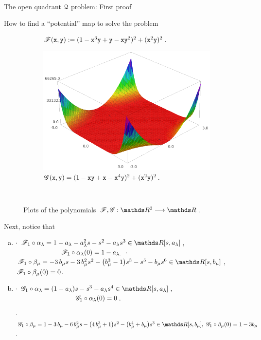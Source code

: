 \documentclass[11pt, a4paper, english, twoside, notitlepage, openright]{report}
\begin{document}
\begin{chapter}{The open quadrant $\mathcal{Q}$ problem: First proof}
\begin{section}{How to find a ``potential'' map to solve the problem}
\begin{figure}[h]
\begin{subfigure}{.49\linewidth}
\caption{$\mathscr{F}({\tt x},{\tt y}):=(1-{\tt x}^3{\tt y}+{\tt y}-{\tt x}{\tt y}^2)^2+({\tt x}^2{\tt y})^2$.\label{fig:F}}
\end{subfigure}
\begin{subfigure}{.50\linewidth}\centering
\includegraphics[width=1\textwidth]{plots/ch1_05_G.png}
\caption{$\mathscr{G}({\tt x},{\tt y})=(1-{\tt x}{\tt y}+{\tt x}-{\tt x}^4{\tt y})^2+({\tt x}^2{\tt y})^2$.\label{fig:G}}
\end{subfigure}\\[1ex]
\caption{Plots of the polynomials $\F,\G:\R^2\longrightarrow\R$.\label{fig:plotFG}}
\end{figure}
Next, notice that
\begin{enumerate}[(a)]
\item $\cdot$ $\F_1\circ\alpha_\lambda=1-a_{\lambda}-a_{\lambda}^{2} s-s^{2}-a_{\lambda} s^{3}\in\R[s,a_{\lambda}]$,
$\qquad\qquad\qquad \,\, \, \,   \mathscr{F}_1\circ\alpha_{\lambda }(0)=1-a_{\lambda. }$ \newline
$\cdot$ $\F_1\circ\beta_{\mu}=-3\,b_{\mu}s-3 \,b_{\mu}^{2} s^{2}-{\left(b_{\mu}^{3}-1\right)}s^{3}-s^{5}-b_{\mu}s^{6}\in\R[s,b_{\mu}]$,
$\, \mathscr{F}_1\circ\beta_{\mu}(0)=0$.
				
\item $\cdot$ $ \G_1\circ\alpha_{\lambda } = {\left(1-a_{\lambda} \right)}s-s^{3}-a_{\lambda} s^{4} \in\R[s,a_{\lambda}]$,
$\qquad\qquad\qquad\qquad\, \, \, \, \,\mathscr{G}_1\circ\alpha_{\lambda }(0)=0$.

$\cdot$ $\G_1\circ\beta_{\mu}=1-3\, b_{\mu}-6\,b_{\mu}^{2}s-{\left(4\,b_{\mu}^{3}+1\right)}s^{2}-{\left(b_{\mu}^{4}+ b_{\mu}\right)}s^{3}\in\R[s,b_{\mu}], \, \, \G_1\circ\beta_{\mu}(0)=1-3b_{\mu}$.
		

\end{enumerate}
\end{section}
\end{chapter}
\end{document}
